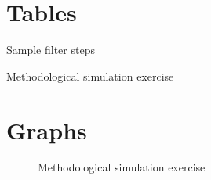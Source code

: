 \documentclass[12pt]{article}
\begin{document}
\clearpage
\section{Tables}

\begin{table}[!h]
    \caption{Sample filter steps}
    \centering
    \resizebox{\textwidth}{!}{}
    \label{table_sample_filter_steps}
\end{table}

\begin{table}[!h]
    \caption{Methodological simulation exercise}
    \begin{center}
    \resizebox{\textwidth}{!}{}
    \label{table_simulation}
    \end{center}
\end{table}

\clearpage
\section{Graphs}

\begin{figure}
    \caption{Methodological simulation exercise}
    \label{graph_simulation}
\end{figure}
\end{document}
